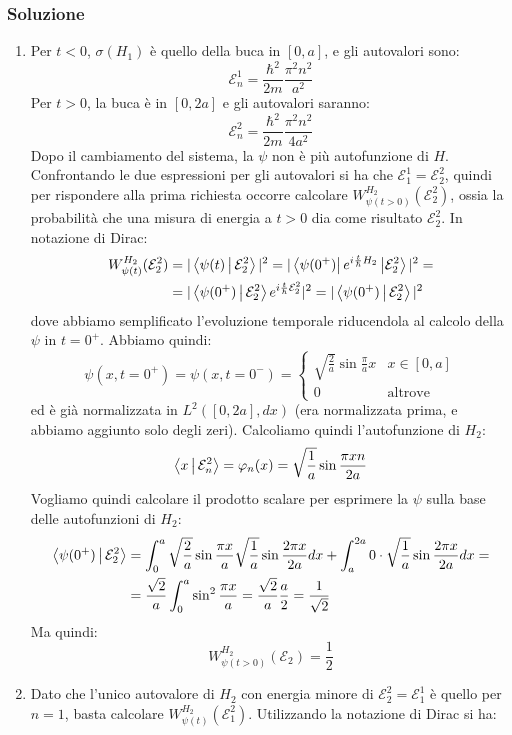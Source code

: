 \documentclass[../../FisicaTeorica.tex]{subfiles}
\begin{document}
\subsubsection{Soluzione}
\begin{enumerate}
\item Per $t<0$, $\sigma(H_1)$ è quello della buca in $[0,a]$, e gli autovalori sono:
\[
\mathcal{E}^1_n = \frac{\hbar^2}{2m}\frac{\pi^2 n^2}{a^2}
\]
Per $t>0$, la buca è in $[0,2a]$ e gli autovalori saranno:
\[
\mathcal{E}^2_n = \frac{\hbar^2}{2m}\frac{\pi^2 n^2}{4a^2}
\]
Dopo il cambiamento del sistema, la $\psi$ non è più autofunzione di $H$. Confrontando le due espressioni per gli autovalori si ha che $\mathcal{E}^1_1 = \mathcal{E}^2_2$, quindi per rispondere alla prima richiesta occorre calcolare $W_{\psi(t>0)}^{H_2} (\mathcal{E}_2^2)$, ossia la probabilità che una misura di energia a $t>0$ dia come risultato $\mathcal{E}_2^2$. In notazione di Dirac:
\begin{align*}
W_{\psi(t)}^{H_2}(\mathcal{E}_2^2)&=|\Braket{\psi(t)|\mathcal{E}_2^2}|^2 = |\Bra{\psi(0^+)}e^{i\frac{t}{\hbar}H_2}\Ket{\mathcal{E}_2^2}|^2 = \\
&=|\Braket{\psi(0^+)|\mathcal{E}^2_2} e^{i\frac{t}{\hbar}\mathcal{E}_2^2}|^2 = |\Braket{\psi(0^+)|\mathcal{E}_2^2}|^2
\end{align*}
dove abbiamo semplificato l'evoluzione temporale riducendola al calcolo della $\psi$ in $t=0^+$.
Abbiamo quindi:
\[
\psi(x,t=0^+) = \psi(x,t=0^-) = \begin{cases}
\sqrt{\frac{2}{a}} \sin \frac{\pi}{a}x & x \in [0,a]\\
0 & \text{altrove}
\end{cases}
\]
ed è già normalizzata in $L^2([0,2a],dx)$ (era normalizzata prima, e abbiamo aggiunto solo degli zeri). Calcoliamo quindi l'autofunzione di $H_2$:
\[
\Braket{x|\mathcal{E}_n^2}=\varphi_n(x)=\sqrt{\frac{1}{a}} \sin \frac{\pi x n}{2a}
\]
Vogliamo quindi calcolare il prodotto scalare per esprimere la $\psi$ sulla base delle autofunzioni di $H_2$:
\begin{align*}
\Braket{\psi(0^+)|\mathcal{E}_2^2} &= \int_0^a \sqrt{\frac{2}{a}}\sin \frac{\pi x}{a} \sqrt{\frac{1}{a}}\sin \frac{2\pi x}{2a} dx +\int_a^{2a} 0\cdot \sqrt{\frac{1}{a}} \sin \frac{2\pi x}{2a}dx =\\
&= \frac{\sqrt{2}}{a}\int_0^a \sin^2 \frac{\pi x}{a}= \frac{\sqrt{2}}{a}\frac{a}{2}=\frac{1}{\sqrt{2}}
\end{align*}
Ma quindi:
\[
W^{H_2}_{\psi(t>0)}(\mathcal{E}_2) = \frac{1}{2}
\]
\item Dato che l'unico autovalore di $H_2$ con energia minore di $\mathcal{E}_2^2=\mathcal{E}_1^1$ è quello per $n=1$, basta calcolare $W^{H_2}_{\psi(t)}(\mathcal{E}_1^2)$. Utilizzando la notazione di Dirac si ha:

\end{enumerate}
\end{document}
